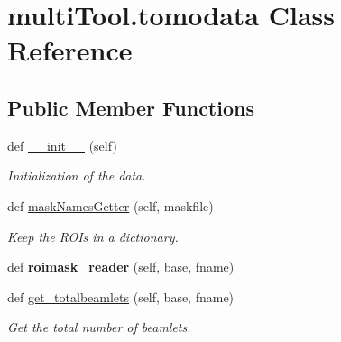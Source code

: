 \hypertarget{classmultiTool_1_1tomodata}{}\section{multi\+Tool.\+tomodata Class Reference}
\label{classmultiTool_1_1tomodata}
\subsection*{Public Member Functions}
\begin{DoxyCompactItemize}
\item 
\mbox{\label{classmultiTool_1_1tomodata_a5afb229515533993e8393b0daefb334c}} 
def \mbox{\hyperlink{classmultiTool_1_1tomodata_a5afb229515533993e8393b0daefb334c}{\+\_\+\+\_\+init\+\_\+\+\_\+}} (self)
\begin{DoxyCompactList}\small\item\em Initialization of the data. \end{DoxyCompactList}\item 
\mbox{\label{classmultiTool_1_1tomodata_abd2f1b1441e3742dfb6bf45033380bab}} 
def \mbox{\hyperlink{classmultiTool_1_1tomodata_abd2f1b1441e3742dfb6bf45033380bab}{mask\+Names\+Getter}} (self, maskfile)
\begin{DoxyCompactList}\small\item\em Keep the R\+OI\textquotesingle{}s in a dictionary. \end{DoxyCompactList}\item 
\mbox{\label{classmultiTool_1_1tomodata_a961ebec9c5be04832dc29b65133bca1e}} 
def {\bfseries roimask\+\_\+reader} (self, base, fname)
\item 
\mbox{\label{classmultiTool_1_1tomodata_a1f36df9bd821a67b9fca6b1bcfbd5a11}} 
def \mbox{\hyperlink{classmultiTool_1_1tomodata_a1f36df9bd821a67b9fca6b1bcfbd5a11}{get\+\_\+totalbeamlets}} (self, base, fname)
\begin{DoxyCompactList}\small\item\em Get the total number of beamlets. \end{DoxyCompactList}\item 
\mbox{\label{classmultiTool_1_1tomodata_a5ee1741b8cee03ef45c948aae95d1a69}} 

\end{DoxyCompactItemize}
